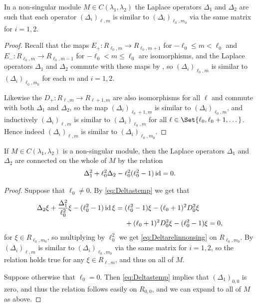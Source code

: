\begin{lemma}\label{lem:nonsingsimilar}
  In a non-singular module $M\in C(\lambda_1,\lambda _2)$ the Laplace operators $\Delta_1$ and $\Delta_2$ are such that each operator $(\Delta_i)_{\ell,m}$ is similar to $(\Delta_i)_{\ell_0,m_0}$ via the same matrix for $i=1,2$. 
\end{lemma}
\begin{proof}
  Recall that the maps $E_+\colon R_{\ell_0,m} \to R_{\ell_0,m+1}$ for $-\ell_0\leq m<\ell_0$ and $E_-\colon R_{\ell_0,m} \to R_{\ell_0,m-1}$ for $-\ell_0<m\leq \ell_0$ are isomorphisms, and the Laplace operators $\Delta_1$ and $\Delta_2$ commute with these maps by , so $(\Delta_i)_{\ell_0,m}$ is similar to $(\Delta_i)_{\ell_0,m_0}$ for each $m$ and $i=1,2$.

  Likewise the $D_+\colon R_{\ell,m}\to R_{\ell+1,m}$ are also isomorphisms for all $\ell$ and commute with both $\Delta_1$ and $\Delta_2$, so the map $(\Delta_i)_{\ell_0+1,m}$ is similar to $(\Delta_i)_{\ell_0,m}$, and inductively $(\Delta_i)_{\ell,m}$ is similar to $(\Delta_i)_{\ell_0,m}$ for all $\ell\in \Set{\ell_0,\ell_0+1,\dotsc}$. Hence indeed $(\Delta_i)_{\ell,m}$ is similar to $(\Delta_i)_{\ell_0,m_0}$.
\end{proof}

\begin{lemma}\label{lem:Deltarelnonsing}
  If $M\in C(\lambda_1,\lambda_2)$ is a non-singular module, then the Laplace operators $\Delta_1$ and $\Delta_2$ are connected on the whole of $M$ by the relation
  \begin{align}\label{eq:Deltarelinnonsing}
    \Delta_1^2 + \ell_0^2\Delta_2 - \ell_0^2(\ell_0^2-1)\operatorname{id} = 0.
  \end{align}
\end{lemma}
\begin{proof}
  Suppose that $\ell_0\neq 0$. By \cref{eq:Deltastemp} we get that
  \begin{align}\label{eq:deltatempcalc}
    \begin{aligned}
      \Delta_2 \xi + \dfrac{\Delta_1^2}{\ell_0^2}\xi - (\ell_0^2-1)\id \xi &= (\ell_0^2-1)\xi - (\ell_0+1)^2D_0^2\xi \\*
      &\phantom{{}={}}{} + (\ell_0+1)^2D_0^2\xi - (\ell_0^2-1)\xi = 0,
    \end{aligned}
  \end{align}
  for $\xi\in R_{\ell_0,m_0}$, so multiplying by $\ell_0^2$ we get \cref{eq:Deltarelinnonsing} on $R_{\ell_0,m_0}$. By  $(\Delta_i)_{\ell,m}$ is similar to $(\Delta_i)_{\ell_0,m_0}$ via the same matrix for $i=1,2$, so the relation holds true for any $\xi\in R_{\ell,m}$, and thus on all of $M$.

  Suppose otherwise that $\ell_0=0$. Then \cref{eq:Deltastemp} implies that $(\Delta_1)_{0,0}$ is zero, and thus the relation follows easily on $R_{0,0}$, and we can expand to all of $M$ as above.
\end{proof}

